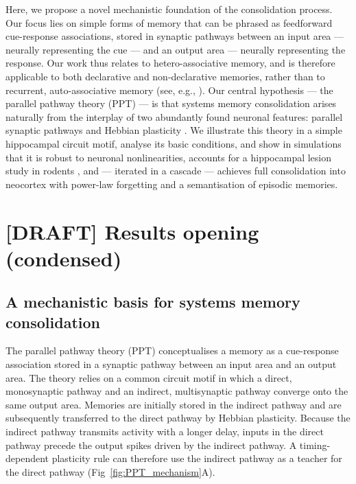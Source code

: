 Here, we propose a novel mechanistic foundation of the consolidation process. Our focus
lies on simple forms of memory that can be phrased as feedforward cue-response
associations, stored in synaptic pathways between an input area --- neurally representing
the cue --- and an output area --- neurally representing the response. Our work thus
relates to hetero-associative memory, and is therefore applicable to both declarative and
non-declarative memories, rather than to recurrent, auto-associative memory (see, e.g.,
\cite{Hopfield1982, Zenke2015, Tome2020}). Our central hypothesis --- the parallel pathway
theory (PPT) --- is that systems memory consolidation arises naturally from the interplay
of two abundantly found neuronal features: parallel synaptic pathways and Hebbian
plasticity \cite{VanEssen1992, Malenka2004}. We illustrate this theory in a simple
hippocampal circuit motif, analyse its basic conditions, and show in simulations that it
is robust to neuronal nonlinearities, accounts for a hippocampal lesion study in rodents
\cite{Remondes2004}, and --- iterated in a cascade --- achieves full consolidation into
neocortex with power-law forgetting \cite{Wixted2004} and a semantisation of episodic
memories.

\section{[DRAFT] Results opening (condensed)}

\subsection{A mechanistic basis for systems memory consolidation}

The parallel pathway theory (PPT) conceptualises a memory as a cue-response association
stored in a synaptic pathway between an input area and an output area. The theory relies
on a common circuit motif in which a direct, monosynaptic pathway and an indirect,
multisynaptic pathway converge onto the same output area. Memories are initially stored in
the indirect pathway and are subsequently transferred to the direct pathway by Hebbian
plasticity. Because the indirect pathway transmits activity with a longer delay, inputs in
the direct pathway precede the output spikes driven by the indirect pathway. A
timing-dependent plasticity rule can therefore use the indirect pathway as a teacher for
the direct pathway (Fig~\ref{fig:PPT_mechanism}A).

